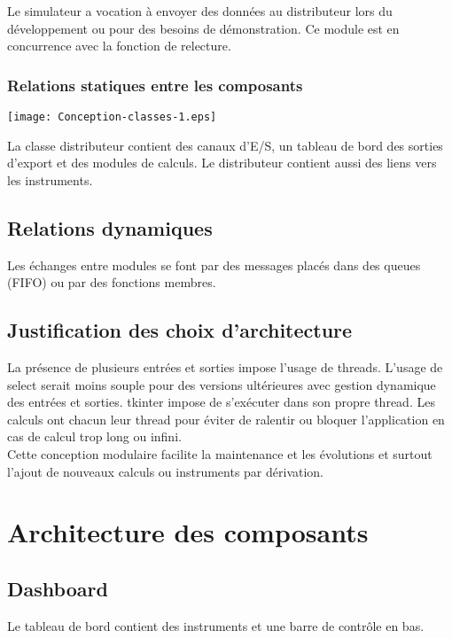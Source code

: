 \documentclass[a4paper,11pt]{report}
\begin{document}
Le simulateur a vocation à envoyer des données au distributeur lors du développement
ou pour des besoins de démonstration. Ce module est en concurrence avec la fonction de relecture.

\subsection{Relations statiques entre les composants}


\texttt{[image: Conception-classes-1.eps]}

La classe distributeur contient des canaux d'E/S, un tableau de bord des sorties d'export
et des modules de calculs. Le distributeur contient aussi des liens vers les instruments. 

\section {Relations dynamiques}

Les échanges entre modules se font par des messages placés dans des queues (FIFO)
ou par des fonctions membres.
 

\section{Justification des choix d'architecture}

La présence de plusieurs entrées et sorties impose l'usage de threads.
L'usage de select serait moins souple pour des versions ultérieures avec
gestion dynamique des entrées et sorties.  
tkinter impose de s'exécuter dans son propre thread.
Les calculs ont chacun leur thread pour éviter de ralentir ou bloquer
l'application en cas de calcul trop long ou infini.
\\

Cette conception modulaire facilite la maintenance et les évolutions
et surtout l'ajout de nouveaux calculs ou instruments par dérivation.

\chapter{Architecture des composants}


\section{Dashboard}

Le tableau de bord contient des instruments et une barre de contrôle en bas.
\end{document}

